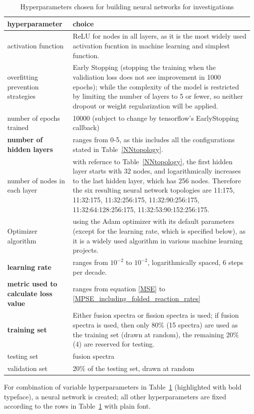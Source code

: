 \documentclass[a4paper, 12pt]{article}
\begin{document}
\begin{table}[H]
\begin{tabularx}{\textwidth}{lX}
hyperparameter & choice  \\
\hline
activation function & ReLU\cite{ReLU} for nodes in all layers, as it is the most widely used activation fucntion in machine learning and simplest function. \\
overfitting prevention strategies & Early Stopping (stopping the training when the validiation loss does not see improvement in 1000 epochs); while the complexity of the model is restricted by limiting the number of layers to 5 or fewer, so neither dropout or weight regularization will be applied. \\
number of epochs trained & 10000 (subject to change by tensorflow's EarlyStopping callback) \\
\textbf{number of hidden layers} & ranges from 0-5, as this includes all the configurations stated in Table~\ref{NNtopology}. \\
number of nodes in each layer & with refernce to Table~\ref{NNtopology}, the first hidden layer starts with 32 nodes, and logarithmically increases to the last hidden layer, which has 256 nodes. Therefore the six resulting neural network topologies are 11:175, 11:32:175, 11:32:256:175, 11:32:90:256:175, 11:32:64:128:256:175, 11:32:53:90:152:256:175.\\
Optimizer algorithm & using the Adam optimizer\cite{AdamOptimizer} with its default parameters (except for the learning rate, which is specified below), as it is a widely used algorithm in various machine learning projects.\\
\textbf{learning rate} & ranges from $10^{-2}$ to $10^{-2}$, logarithmically spaced, 6 steps per decade.\\
\textbf{metric used to calculate loss value} & ranges from equation \ref{MSE} to \ref{MPSE_including_folded_reaction_rates}\\
\textbf{training set} & Either fusion spectra or fission spectra is used; if fusion spectra is used, then only 80\% (15 spectra) are used as the training set (drawn at random), the remaining 20\%(4) are reserved for testing. \\
testing set & fusion spectra\\
validation set & 20\% of the testing set, drawn at random
\end{tabularx}
\caption{Hyperparameters chosen for building neural networks for investigations}\label{HyperparameterRange}
\end{table}
For combination of variable hyperparameters in Table~\ref{HyperparameterRange} (highlighted with bold typeface), a neural network is created; all other hyperparameters are fixed according to the rows in Table~\ref{HyperparameterRange} with plain font.
\end{document}
